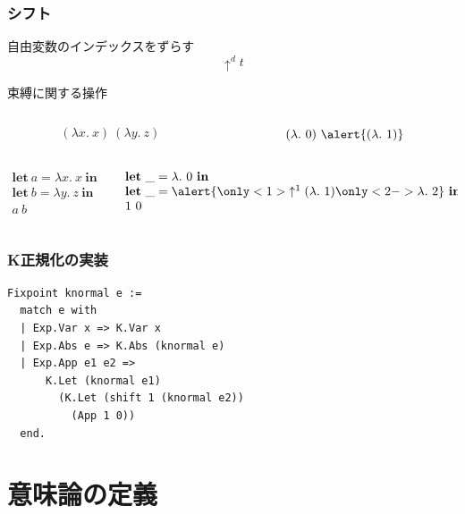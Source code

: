 \documentclass[dvipdfmx,cjk,xcolor=dvipsnames,envcountsect,notheorems,12pt]{beamer}
\theoremstyle{definition}
\newcommand{\keyword}[1]{\mathbf{#1}}
\newcommand{\LET}{\keyword{let}}
\newcommand{\IN}{\keyword{in}}
\begin{document}
\begin{frame}
	\frametitle{シフト}
	\LARGE 自由変数のインデックスをずらす
	\[\uparrow^d t \]

	束縛に関する操作
	{\large \begin{columns}
		\begin{column}{0.5\textwidth}
			\[ (\lambda x.~x)~(\lambda y.~z) \]
		\end{column}
		\begin{column}{0.5\textwidth}
			\[ (\lambda.~0)~\alert{(\lambda.~1)} \]
		\end{column}
	\end{columns}

	\vfill

	\begin{columns}
		\begin{column}{0.5\textwidth}
			\[ 
					\begin{array}{l}
						\LET~a = \lambda x.~x~\IN \\
						\LET~b = \lambda y.~z~\IN \\
						a~b
					\end{array}
			\]
		\end{column}
		\begin{column}{0.5\textwidth}
			\[
				\begin{array}{l}
					\LET~\_ = \lambda.~0~\IN \\
					\LET~\_ = \alert{\only<1>{\uparrow^1(\lambda.~1)}\only<2->{\lambda.~2}}~\IN \\
					1~0
				\end{array}
			\]
		\end{column}
	\end{columns}}
	\pause
\end{frame}

\begin{frame}[fragile]
	\frametitle{K正規化の実装}
\begin{lstlisting}[basicstyle={\ttfamily\normalsize}]
Fixpoint knormal e :=
  match e with
  | Exp.Var x => K.Var x
  | Exp.Abs e => K.Abs (knormal e)
  | Exp.App e1 e2 =>
      K.Let (knormal e1)
        (K.Let (shift 1 (knormal e2))
          (App 1 0))
  end.
\end{lstlisting}
\end{frame}

\section{意味論の定義}
\end{document}
